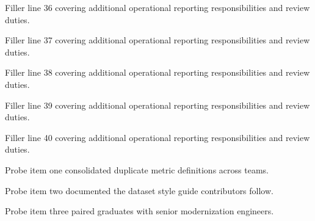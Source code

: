 \documentclass[fontsize=11pt, margin=narrow, medium=print]{careerdossier-cv}
\begin{document}
\begin{CDossierEntry}[title = {Modernization Program}, organization = {Continental Reliability Consortium}, location = {Ottawa, ON}, dates = {2019--Present}]
\begin{CDossierItemize}
    \item Filler line 36 covering additional operational reporting responsibilities and review duties.
    \item Filler line 37 covering additional operational reporting responsibilities and review duties.
    \item Filler line 38 covering additional operational reporting responsibilities and review duties.
    \item Filler line 39 covering additional operational reporting responsibilities and review duties.
    \item Filler line 40 covering additional operational reporting responsibilities and review duties.
  \end{CDossierItemize}
\end{CDossierEntry}
\begin{CDossierEntry}[title = {Reporting Platform Review}, organization = {Regional Data Cooperative}, location = {Kitchener, ON}, dates = {2015--2019}]
  \begin{CDossierItemize}
    \item Probe item one consolidated duplicate metric definitions across teams.
    \item Probe item two documented the dataset style guide contributors follow.
    \item Probe item three paired graduates with senior modernization engineers.
  \end{CDossierItemize}
\end{CDossierEntry}
\end{document}
